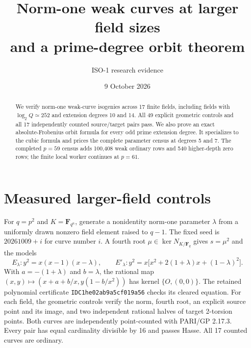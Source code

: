 \documentclass[11pt]{article}
\title{Norm-one weak curves at larger field sizes\\and a prime-degree orbit theorem}
\author{ISO-1 research evidence}
\date{9 October 2026}
\newcommand{\F}{\mathbf F}
\begin{document}
\maketitle
\begin{abstract}
We verify norm-one weak-curve isogenies across 17 finite fields, including
fields with $\log_2 Q\simeq252$ and extension degrees 10 and 14.
All 49 explicit geometric controls and all 17 independently counted
source/target pairs pass. We also prove an exact absolute-Frobenius orbit
formula for every odd prime extension degree. It specializes to the
cubic formula and prices the complete parameter census at degrees 5
and 7. The completed $p=59$ census adds 100,408 weak ordinary rows
and 540 higher-depth zero rows; the finite local worker continues at $p=61$.
\end{abstract}

\section{Measured larger-field controls}
For $q=p^2$ and $K=\F_{q^n}$, generate a nonidentity norm-one parameter
$\lambda$ from a uniformly drawn nonzero field element raised to $q-1$.
The fixed seed is $20261009+i$ for curve number $i$. A fourth root
$\mu\in\ker N_{K/\F_q}$ gives $s=\mu^2$ and the models
\[
 E_\lambda:y^2=x(x-1)(x-\lambda),\qquad
 E'_\lambda:y^2=x\bigl[x^2+2(1+\lambda)x+(1-\lambda)^2\bigr].
\]
With $a=-(1+\lambda)$ and $b=\lambda$, the rational map
$(x,y)\mapsto(x+a+b/x,y(1-b/x^2))$ has kernel $\{O,(0,0)\}$.
The retained polynomial certificate \texttt{IDC1he02ab9a5cf019a56}
checks its cleared equation. For each field, the geometric controls
verify the norm, fourth root, an explicit source point and its image,
and two independent rational halves of target 2-torsion points.
Both curves are independently point-counted with PARI/GP 2.17.3.
Every pair has equal cardinality divisible by 16 and passes Hasse.
All 17 counted curves are ordinary.
\end{document}
